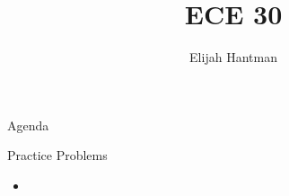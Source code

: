 \documentclass{report}
\title{\Huge{ECE 30}}
\author{\huge{Elijah Hantman}}
\date{}
\begin{document}
\maketitle
\newpage

\begin{description}
    \item {\large Agenda} 
    \item {\large Practice Problems}
        \begin{mdframed}
           \begin{itemize}
               \item 
           \end{itemize} 
        \end{mdframed}
\end{description}
\end{document}
